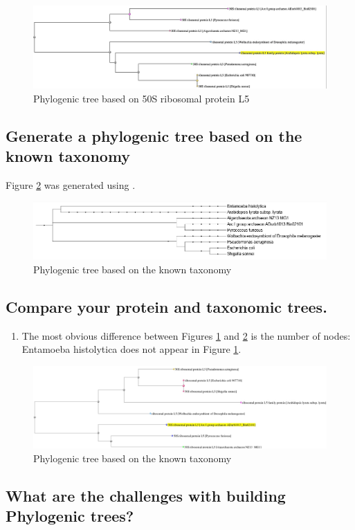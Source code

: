 \documentclass[]{article}
\begin{document}
\begin{figure}[H]
	\caption{Phylogenic tree based on 50S ribosomal protein L5}\label{fig:Phylo1}
	\includegraphics[width=\textwidth]{Phylo1}
\end{figure}

\subsection{Generate a phylogenic tree based on the known taxonomy}

Figure \ref{fig:Phylo2} was generated using \cite{biobyte2019phylot}.

\begin{figure}[H]
	\caption{Phylogenic tree based on the known taxonomy}\label{fig:Phylo2}
	\includegraphics[width=\textwidth]{Phylo2}
\end{figure}

\subsection{ Compare your protein and taxonomic trees.}

\begin{enumerate}
	\item The most obvious difference between Figures \ref{fig:Phylo1} and  \ref{fig:Phylo2} is the number of nodes: Entamoeba histolytica does not appear in Figure \ref{fig:Phylo1}.
\end{enumerate}

\begin{figure}[H]
	\caption{Phylogenic tree based on the known taxonomy}\label{fig:Phylo3}
	\includegraphics[width=\textwidth]{Pholo3}
\end{figure}

\subsection{ What are the challenges with building Phylogenic trees?}



\printglossaries




\end{document}
